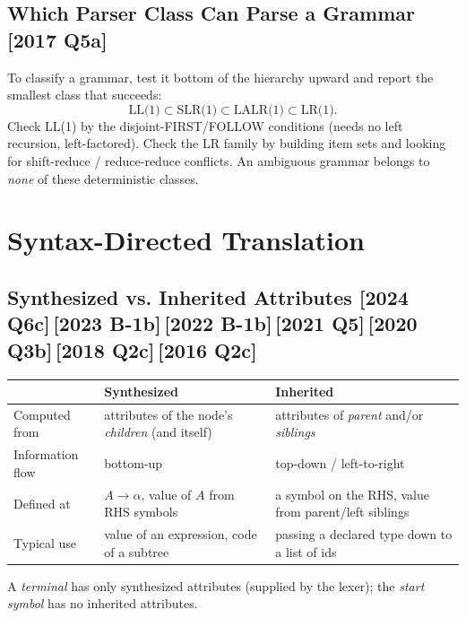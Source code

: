 \documentclass[12pt, a4paper]{article}
\newenvironment{qbox}{\begin{mdframed}[style=qframe]}{\end{mdframed}}
\newcommand{\yr}[1]{{\small\color{accent}\textbf{[#1]}}}
\begin{document}
\subsection{Which Parser Class Can Parse a Grammar \yr{2017 Q5a}}
\begin{qbox}
To classify a grammar, test it bottom of the hierarchy upward and report the smallest class that succeeds:
\[ \text{LL(1)} \subset \text{SLR(1)} \subset \text{LALR(1)} \subset \text{LR(1)}. \]
Check LL(1) by the disjoint-FIRST/FOLLOW conditions (needs no left recursion, left-factored). Check the LR family by
building item sets and looking for shift-reduce / reduce-reduce conflicts. An ambiguous grammar belongs to \emph{none}
of these deterministic classes.
\end{qbox}

\section{Syntax-Directed Translation}

\subsection{Synthesized vs. Inherited Attributes \yr{2024 Q6c}\,\yr{2023 B-1b}\,\yr{2022 B-1b}\,\yr{2021 Q5}\,\yr{2020 Q3b}\,\yr{2018 Q2c}\,\yr{2016 Q2c}}
\begin{qbox}
\begin{tabularx}{\linewidth}{@{}l Y Y@{}}
\toprule
 & \textbf{Synthesized} & \textbf{Inherited}\\
\midrule
Computed from & attributes of the node's \emph{children} (and itself) & attributes of \emph{parent} and/or \emph{siblings}\\
Information flow & bottom-up & top-down / left-to-right\\
Defined at & $A\to\alpha$, value of $A$ from RHS symbols & a symbol on the RHS, value from parent/left siblings\\
Typical use & value of an expression, code of a subtree & passing a declared type down to a list of ids\\
\bottomrule
\end{tabularx}
\smallskip
A \emph{terminal} has only synthesized attributes (supplied by the lexer); the \emph{start symbol} has no inherited attributes.
\end{qbox}
\end{document}
